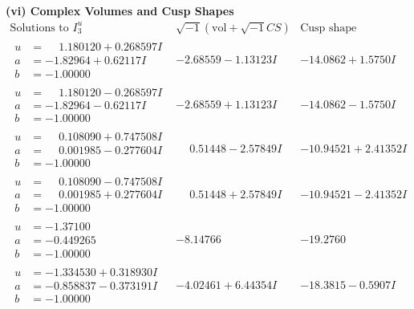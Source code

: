 \documentclass[1p]{elsarticle_modified}
\theoremstyle{definition}
\newcommand{\I}{\sqrt{-1}}
\begin{document}
\newpage\flushleft \textbf{(vi) Complex Volumes and Cusp Shapes}
$$\begin{array}{c|c|c}  
\text{Solutions to }I^u_{3}& \I (\text{vol} + \sqrt{-1}CS) & \text{Cusp shape}\\
 \hline 
\begin{aligned}
u &= \phantom{-}1.180120 + 0.268597 I \\
a &= -1.82964 + 0.62117 I \\
b &= -1.00000\phantom{ +0.000000I}\end{aligned}
 & -2.68559 - 1.13123 I & -14.0862 + 1.5750 I \\ \hline\begin{aligned}
u &= \phantom{-}1.180120 - 0.268597 I \\
a &= -1.82964 - 0.62117 I \\
b &= -1.00000\phantom{ +0.000000I}\end{aligned}
 & -2.68559 + 1.13123 I & -14.0862 - 1.5750 I \\ \hline\begin{aligned}
u &= \phantom{-}0.108090 + 0.747508 I \\
a &= \phantom{-}0.001985 - 0.277604 I \\
b &= -1.00000\phantom{ +0.000000I}\end{aligned}
 & \phantom{-}0.51448 - 2.57849 I & -10.94521 + 2.41352 I \\ \hline\begin{aligned}
u &= \phantom{-}0.108090 - 0.747508 I \\
a &= \phantom{-}0.001985 + 0.277604 I \\
b &= -1.00000\phantom{ +0.000000I}\end{aligned}
 & \phantom{-}0.51448 + 2.57849 I & -10.94521 - 2.41352 I \\ \hline\begin{aligned}
u &= -1.37100\phantom{ +0.000000I} \\
a &= -0.449265\phantom{ +0.000000I} \\
b &= -1.00000\phantom{ +0.000000I}\end{aligned}
 & -8.14766\phantom{ +0.000000I} & -19.2760\phantom{ +0.000000I} \\ \hline\begin{aligned}
u &= -1.334530 + 0.318930 I \\
a &= -0.858837 - 0.373191 I \\
b &= -1.00000\phantom{ +0.000000I}\end{aligned}
 & -4.02461 + 6.44354 I & -18.3815 - 0.5907 I \\ \hline\begin{aligned}

\end{aligned}
\end{array}$$
\end{document}
